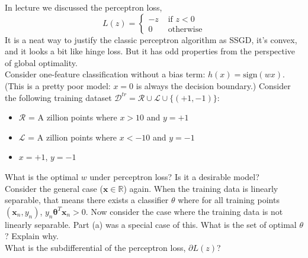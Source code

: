 \documentclass[11pt]{article}
\newcommand{\mbf}[1]{{\mathbf{#1}}}
\begin{document}
\begin{problem}{6}
In lecture we discussed the perceptron loss,
\[ L(z) = \begin{cases} -z &\text{ if } z<0 \\ 0 &\text{ otherwise} \end{cases} \]
It is a neat way to justify the classic perceptron algorithm as SSGD, it's convex, and it looks a bit like hinge loss.  %
But it has odd properties from the perspective of global optimality. \\

 Consider one-feature classification without a bias term: $h(x) = \text{sign}(w x)$. (This is a pretty poor model: $x=0$ is always the decision boundary.)  
Consider the following training dataset 
$\mathcal{D}^{tr} = \mathcal{R} \cup \mathcal{L} \cup \{(+1,-1)\}$:
\begin{itemize}
\item $\mathcal{R}$ = A zillion points where $x>10$ and $y=+1$ 
\item $\mathcal{L}$ = A zillion points where $x< -10$ and $y=-1$
\item $x=+1$, $y=-1$
\end{itemize}

What is the optimal $w$ under perceptron loss?  Is it a desirable model? \\

 Consider the general case ($\mbf{x} \in \mathbb{R}$) again. When the training data is linearly separable, that means there exists a classifier $\theta$ where for all training points $(\mbf{x}_n, y_n)$, $y_n \mbf{\theta}^T \mbf{x}_n > 0$. 
Now consider the case where the training data is not linearly separable. Part (a) was a special case of this.
What is the set of optimal $\theta$? Explain why. \\

 What is the subdifferential of the perceptron loss, $\partial L(z)$? \\



\end{problem}

%
%
%
\end{document}

